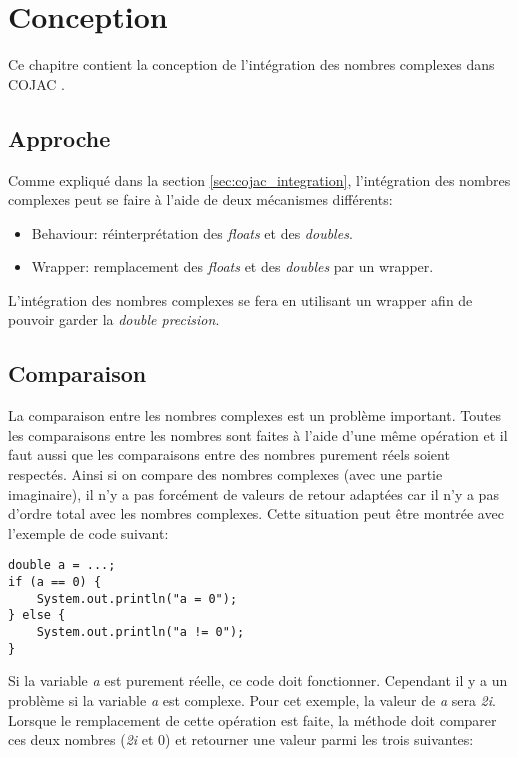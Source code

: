 \section{Conception}

Ce chapitre contient la conception de l'intégration des nombres complexes dans COJAC \cite{COJAC}.

\subsection{Approche}
\label{sec:complex_approach}

Comme expliqué dans la section \ref{sec:cojac_integration}, l'intégration des nombres complexes peut se faire à l'aide de deux mécanismes différents:
\begin{itemize}
    \item Behaviour: réinterprétation des \textit{floats} et des \textit{doubles}.
    \item Wrapper: remplacement des \textit{floats} et des \textit{doubles} par un wrapper.
\end{itemize}

L'intégration des nombres complexes se fera en utilisant un wrapper afin de pouvoir garder la \textit{double precision}.

\subsection{Comparaison}
\label{sec:complex_design_comparison}

La comparaison entre les nombres complexes est un problème important. Toutes les comparaisons entre les nombres sont faites à l'aide d'une même opération et il faut aussi que les comparaisons entre des nombres purement réels soient respectés. Ainsi si on compare des nombres complexes (avec une partie imaginaire), il n'y a pas forcément de valeurs de retour adaptées car il n'y a pas d'ordre total avec les nombres complexes. Cette situation peut être montrée avec l'exemple de code suivant:

\begin{verbatim}
double a = ...;
if (a == 0) {
    System.out.println("a = 0");
} else {
    System.out.println("a != 0");
}
\end{verbatim}

Si la variable \textit{a} est purement réelle, ce code doit fonctionner. Cependant il y a un problème si la variable \textit{a} est complexe. Pour cet exemple, la valeur de \textit{a} sera \textit{2i}. Lorsque le remplacement de cette opération est faite, la méthode doit comparer ces deux nombres (\textit{2i} et 0) et retourner une valeur parmi les trois suivantes:

